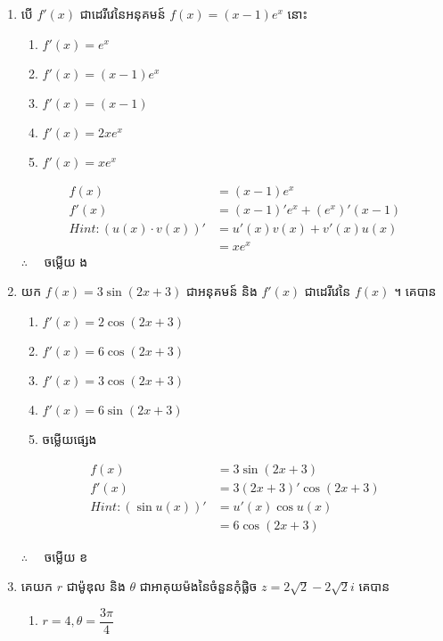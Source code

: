 \documentclass[12pt, a4paper]{article}
\begin{document}
\begin{enumerate}[m]
	\item បើ $f'(x)$ ជាដេរីវេនៃអនុគមន៍ $f(x)=\left(x-1\right)e^x$ នោះ
	\begin{enumerate}[k,3]
		\item $f'(x)=e^x$
		\item $f'(x)=\left(x-1\right)e^x$
		\item $f'(x)=\left(x-1\right)$
		\item $f'(x)=2xe^x$
		\item $f'(x)=xe^x$
	\end{enumerate}
	\answer
	\begin{center}
		\begin{align*}
		f(x)&=\left(x-1\right)e^x\\
		f'(x)&=\left(x-1\right)'e^x+\left(e^x\right)'\left(x-1\right)\\
		Hint: \left(u(x)\cdot v(x)\right)'&=u'(x)v(x)+v'(x)u(x)\\
		&=xe^x
		\end{align*}
		$\therefore \quad$ \kml ចម្លើយ \kbk ង
	\end{center}
	{\color{blue}\hrulefill}
	\item យក $f(x)=3\sin\left(2x+3\right)$ ជាអនុគមន៍ និង $f'(x)$ ជាដេរីវេនៃ $f(x)$ ។ គេបាន
	\begin{enumerate}[k,3]
		\item $f'(x)=2\cos\left(2x+3\right)$
		\item $f'(x)=6\cos\left(2x+3\right)$
		\item $f'(x)=3\cos\left(2x+3\right)$
		\item $f'(x)=6\sin\left(2x+3\right)$
		\item ចម្លើយផ្សេង
	\end{enumerate}
	\answer
	\begin{align*}
	f(x)&=3\sin\left(2x+3\right)\\
	f'(x)&=3\left(2x+3\right)'\cos\left(2x+3\right)\\
	Hint: \left(\sin u(x)\right)'&=u'(x)\cos u(x)\\
	&=6\cos\left(2x+3\right)
	\end{align*}
	\begin{center}
		$\therefore \quad$ \kml ចម្លើយ \kbk ខ
	\end{center}
	{\color{blue}\hrulefill}
	\item គេយក $r$ ជាម៉ូឌុល និង $\theta$ ជាអាគុយម៉ងនៃចំនួនកុំផ្លិច $z=2\sqrt{2}-2\sqrt{2}i$ គេបាន
	\begin{enumerate}[k,3]
		\item $r=4,\theta=\dfrac{3\pi}{4}$

\end{enumerate}
\end{enumerate}
\end{document}
